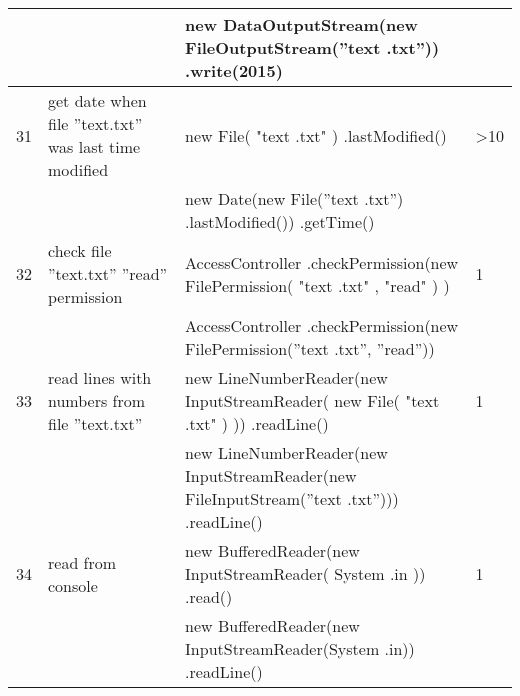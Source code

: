 \begin{longtable}{|p{}|p{}|p{}|p{}|}
		\rowcolor[HTML]{9AFF99} 
		&                                                        & new DataOutputStream(new FileOutputStream(”text .txt”)) .write(2015)                                             &                                         \\ \hline
		\rowcolor[HTML]{FFCCC9} 
		31                                & get date when file ”text.txt” was last time modified   & new File( "text .txt" )  .lastModified()                                                                         & \textgreater{}10                        \\ \hline
		\rowcolor[HTML]{9AFF99} 
		&                                                        & new Date(new File(”text .txt”) .lastModified()) .getTime()                                                       &                                         \\ \hline
		\rowcolor[HTML]{FFCCC9} 
		32                                & check file ”text.txt” ”read” permission                & AccessController .checkPermission(new FilePermission( "text .txt" , "read" ) )                                   & 1                                       \\ \hline
		\rowcolor[HTML]{9AFF99} 
		&                                                        & AccessController .checkPermission(new FilePermission(”text .txt”, ”read”))                                       &                                         \\ \hline
		\rowcolor[HTML]{FFCCC9} 
		33                                & read lines with numbers from file ”text.txt”           & new LineNumberReader(new InputStreamReader( new File( "text .txt" ) )) .readLine()                               & 1                                       \\ \hline
		\rowcolor[HTML]{9AFF99} 
		&                                                        & new LineNumberReader(new InputStreamReader(new FileInputStream(”text .txt”))) .readLine()                        &                                         \\ \hline
		\rowcolor[HTML]{FFCCC9} 
		34                                & read from console                                      & new BufferedReader(new InputStreamReader( System .in )) .read()                                                  & 1                                       \\ \hline
		\rowcolor[HTML]{9AFF99} 
		&                                                        & new BufferedReader(new InputStreamReader(System .in)) .readLine()                                                &                                         \\ \hline

\end{longtable}
